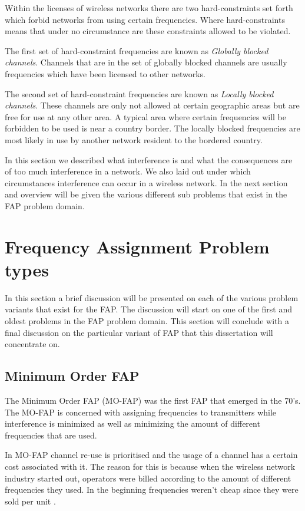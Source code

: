 Within the licenses of wireless networks there are two hard-constraints set forth which forbid networks from using certain frequencies. Where hard-constraints means that under no circumstance are these constraints allowed to be violated.

The first set of hard-constraint frequencies are known as \emph{Globally blocked channels}. Channels that are in the set of globally blocked channels are usually frequencies which have been licensed to other networks\cite{Eisenblatter,Karen2004,InterferenceOrientatedFAP}.

The second set of hard-constraint frequencies are known as \emph{Locally blocked channels}. These channels are only not allowed at certain geographic areas but are free for use at any other area\cite{Eisenblatter,Karen2004,InterferenceOrientatedFAP}. A typical area where certain frequencies will be forbidden to be used is near a country border\cite{Eisenblatter,Karen2004,InterferenceOrientatedFAP}. The locally blocked frequencies are most likely in use by another network resident to the bordered country.

In this section we described what interference is and what the consequences are of too much interference in a network. We also laid out under which circumstances interference can occur in a wireless network. In the next section and overview will be given the various different sub problems that exist in the FAP problem domain.

\section{Frequency Assignment Problem types}
\label{sec:FAPVariants}
In this section a brief discussion will be presented on each of the various problem variants that exist for the FAP. The discussion will start on one of the first and oldest problems in the FAP problem domain. This section will conclude with a final discussion on the particular variant of FAP that this dissertation will concentrate on.
\subsection{Minimum Order FAP}
The Minimum Order FAP (MO-FAP) was the first FAP that emerged in the 70's. The MO-FAP is concerned with assigning frequencies to transmitters while interference is minimized as well as minimizing the amount of different frequencies that are used. 

In MO-FAP channel re-use is prioritised and the usage of a channel has a certain cost associated with it. The reason for this is because when the wireless network industry started out, operators were billed according to the amount of different frequencies they used. In the beginning frequencies weren't cheap since they were sold per unit \cite{Karen2004,MontemanniThesis}. 

